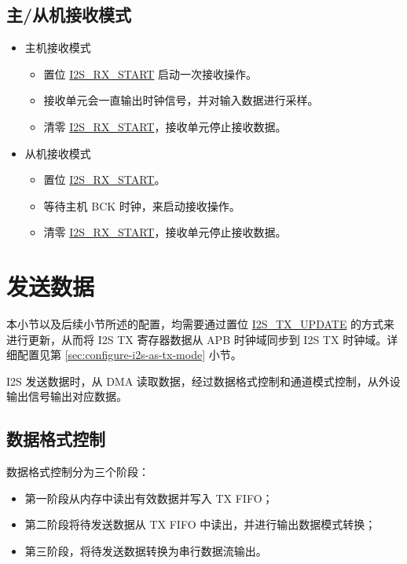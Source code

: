\documentclass[main\_\_CN.tex]{subfiles}
\begin{document}
\subsection{主/从机接收模式}
\begin{itemize}
    \item 主机接收模式
    \begin{itemize}
        \item 置位 \hyperref[fielddesc:I2SRXSTART]{I2S\_RX\_START} 启动一次接收操作。
        \item 接收单元会一直输出时钟信号，并对输入数据进行采样。
        \item 清零 \hyperref[fielddesc:I2SRXSTART]{I2S\_RX\_START}，接收单元停止接收数据。
    \end{itemize}
    \item 从机接收模式
     \begin{itemize}
        \item 置位 \hyperref[fielddesc:I2SRXSTART]{I2S\_RX\_START}。
        \item 等待主机 BCK 时钟，来启动接收操作。
        \item 清零 \hyperref[fielddesc:I2SRXSTART]{I2S\_RX\_START}，接收单元停止接收数据。
    \end{itemize}
\end{itemize}

\section{发送数据}\label{TXCHAN}

\begin{tiplisting}
本小节以及后续小节所述的配置，均需要通过置位 \hyperref[fielddesc:I2STXUPDATE]{I2S\_TX\_UPDATE} 的方式来进行更新，从而将 I2S TX 寄存器数据从 APB 时钟域同步到 I2S TX 时钟域。详细配置见第 \ref{sec:configure-i2s-as-tx-mode} 小节。
\end{tiplisting}
\vspace{-2em}
\chipname{} I2S 发送数据时，从 DMA 读取数据，经过数据格式控制和通道模式控制，从外设输出信号输出对应数据。
\subsection{数据格式控制}
数据格式控制分为三个阶段：
\begin{itemize}
    \item 第一阶段从内存中读出有效数据并写入 TX FIFO；
    \item 第二阶段将待发送数据从 TX FIFO 中读出，并进行输出数据模式转换；
    \item 第三阶段，将待发送数据转换为串行数据流输出。
\end{itemize}
\end{document}
